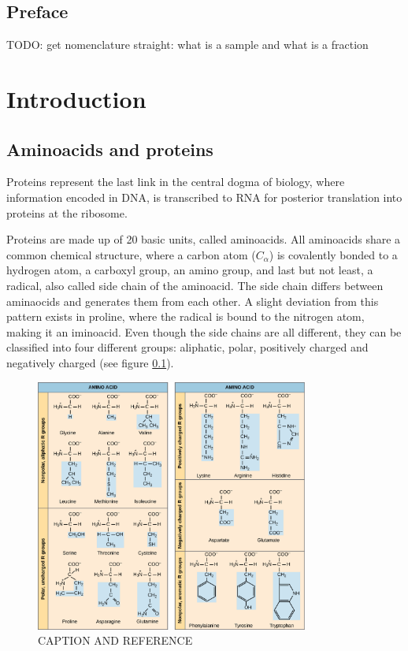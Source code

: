 \documentclass[11pt, a4paper]{report}
\begin{document}
\section*{Preface}

TODO: get nomenclature straight: what is a sample and what is a fraction


\chapter*{Introduction}
\label{chap:introduction}

\section{Aminoacids and proteins}

Proteins represent the last link in the central dogma of biology, where information encoded in DNA, is transcribed to RNA for posterior translation into proteins at the ribosome.

Proteins are made up of 20 basic units, called aminoacids. All aminoacids share a common chemical structure, where a carbon atom ($C_\alpha$) is covalently bonded to a hydrogen atom, a carboxyl group, an amino group, and last but not least, a radical, also called side chain of the aminoacid. The side chain differs between aminaocids and generates them from each other. A slight deviation from this pattern exists in proline, where the radical is bound to the nitrogen atom, making it an iminoacid. Even though the side chains are all different, they can be classified into four different groups: aliphatic, polar, positively charged and negatively charged (see figure \ref{fig:aminoacids}).

\begin{figure}
  \centering
  \includegraphics[width=0.8\textwidth]{aminoacids2.png}
  \caption{CAPTION AND REFERENCE}
  \label{fig:aminoacids}
\end{figure}
\end{document}
